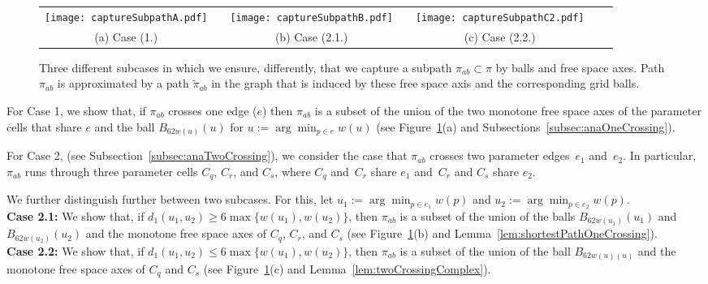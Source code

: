 \documentclass[a4paper,11pt]{article}
\begin{document}
	
\begin{figure}[ht]
  \begin{center}
    \begin{tabular}{ccccccc}
       \texttt{[image: captureSubpathA.pdf]} & &
       \texttt{[image: captureSubpathB.pdf]} & &
       \texttt{[image: captureSubpathC2.pdf]}&&\\ 
      {\small (a) Case (1.)} & &
      {\small (b) Case (2.1.)}&&
      {\small (c) Case (2.2.)}\\
\end{tabular}
  \end{center}
  \vspace*{-12pt}
  \caption{Three different subcases in which we  ensure, differently, that we capture a subpath $\pi_{ab} \subset \pi$ by balls and free space axes. Path $\pi_{ab}$ is approximated by a path $\widetilde{\pi}_{ab}$ in the graph that is induced by these free space axis and the corresponding grid balls.}
  \label{fig:captureTheSubpath}
\end{figure}
	
    For Case 1, we show that, if $\pi_{ab}$ crosses one edge ($e$) then $\pi_{ab}$ is a subset of the union of the two monotone free space axes of the parameter cells that share $e$ and the ball $B_{62w(u)}(u)$ for $u := \arg \min_{p \in e}w(u)$  (see Figure~\ref{fig:captureTheSubpath}(a) and Subsections~\ref{subsec:anaOneCrossing}).
	
	For Case 2,  (see Subsection~\ref{subsec:anaTwoCrossing}), we consider the case that $\pi_{ab}$ crosses two parameter edges~$e_1$ and~$e_2$. In particular, $\pi_{ab}$ runs through three parameter cells $C_q$, $C_r$, and $C_s$, where $C_q$ and~$C_r$ share $e_1$ and~$C_r$ and $C_s$ share $e_2$. 
	
	We further distinguish further between two subcases. For this, let $u_1 := \arg \min_{p \in e_1} w(p)$ and $u_2 := \arg \min_{p \in e_2} w(p)$. \\
{\bf Case 2.1:}  We show that, if $d_1(u_1,u_2) \geq 6 \max \{ w(u_1),w(u_2) \}$, then $\pi_{ab}$ is a subset of the union of the balls $B_{62w(u_1)}(u_1)$ and $B_{62w(u_2)}(u_2)$ and the monotone free space axes of $C_q$, $C_r$, and $C_s$ (see Figure~\ref{fig:captureTheSubpath}(b) and Lemma~\ref{lem:shortestPathOneCrossing}).\\ 
{\bf Case 2.2:} We show that, if $d_1(u_1,u_2) \leq 6 \max \{ w(u_1),w(u_2) \}$, then $\pi_{ab}$ is a subset of the union of the ball $B_{62w(u)(u)}$ and the monotone free space axes of $C_q$ and $C_s$ (see Figure~\ref{fig:captureTheSubpath}(c) and Lemma~\ref{lem:twoCrossingComplex}).
	
\end{document}
